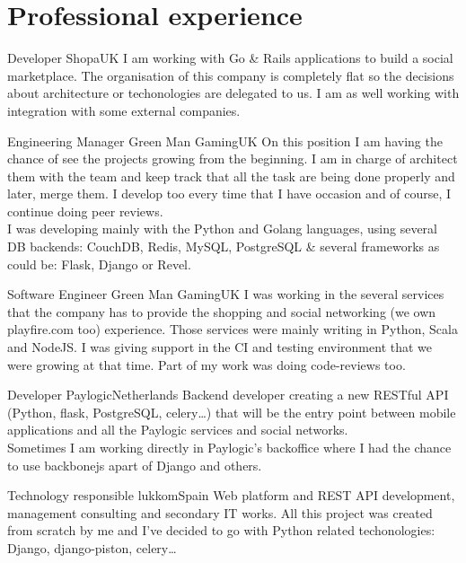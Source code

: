 \documentclass[10pt, a4paper]{moderncv}
\begin{document}
\maketitle


%
%

\section{Professional experience}
{Developer}
{Shopa}{UK}{}
{I am working with Go \& Rails applications to build a social marketplace. The
organisation of this company is completely flat so the decisions about
architecture or techonologies are delegated to us. I am as well working with
integration with some external companies.}

{Engineering Manager}
{Green Man Gaming}{UK}{}
{On this position I am having the chance of see the projects growing from the
beginning. I am in charge of architect them with the team and keep track that
all the task are being done properly and later, merge them. I develop too every
time that I have occasion and of course, I continue doing peer reviews.\\I was
developing mainly with the Python and Golang languages, using several DB
backends: CouchDB, Redis, MySQL, PostgreSQL \& several frameworks as could be:
Flask, Django or Revel.}

{Software Engineer}
{Green Man Gaming}{UK}{}
{I was working in the several services that the company has to provide the
shopping and social networking (we own playfire.com too) experience. Those
services were mainly writing in Python, Scala and NodeJS. I was giving support
in the CI and testing environment that we were growing at that time. Part of my
work was doing code-reviews too.}

{Developer}
{Paylogic}{Netherlands}{}
{Backend developer creating a new RESTful API (Python, flask, PostgreSQL,
celery\ldots) that will be the entry point between mobile applications and all
the Paylogic services and social networks.\\Sometimes I am working directly in
Paylogic's backoffice where I had the chance to use backbonejs apart of Django
and others.}

{Technology responsible}
{lukkom}{Spain}{}
{Web platform and REST API development, management consulting and secondary IT
works. All this project was created from scratch by me and I've decided to go
with Python related techonologies: Django, django-piston, celery\ldots}
\end{document}
